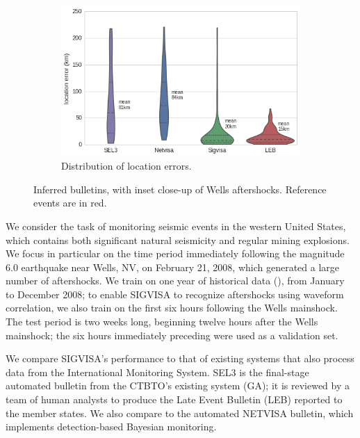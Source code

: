 \documentclass[twoside]{article} \usepackage{aistats2017}
\begin{document}
\begin{figure}
\begin{subfigure}[b]{0.30\textwidth}
\label{fig:sigvisa_map}
\end{subfigure}
\begin{subfigure}[b]{0.30\textwidth}
    \includegraphics[width=\textwidth]{location_err_violin_test}
    \caption{Distribution of location errors.}
  \label{fig:test_location_err}
\end{subfigure}
\caption{Inferred bulletins, with inset close-up of Wells
  aftershocks. Reference events are in red.}
\label{fig:inferred_map}
\end{figure}


We consider the task of monitoring seismic events in the western
United States, which contains both significant natural seismicity and
regular mining explosions. We focus in particular on the time period
immediately following the magnitude 6.0 earthquake near Wells, NV, on
February 21, 2008, which generated a large number of aftershocks. We
train on one year of historical data  (), from January to December 2008; to enable SIGVISA to recognize aftershocks using waveform
correlation, we also train on the first six hours following the Wells mainshock. The test period is two weeks long, beginning twelve hours
after the Wells mainshock; the six hours immediately preceding were used as a validation set.

We compare SIGVISA's performance to that of existing systems that also
process data from the International Monitoring System.  SEL3 is the
final-stage automated bulletin from the CTBTO's existing system (GA); it is reviewed by a team of human analysts to
produce the Late Event Bulletin (LEB) reported to the member
states. We also compare to the automated NETVISA bulletin\citep{arora2013net}, which
implements detection-based Bayesian monitoring. 
\end{document}
